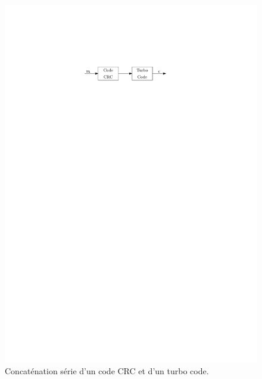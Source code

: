 \begin{figure}[tb]
	\begin{center}
	\includegraphics[]{main/ch1_fig/abaiss/crc.pdf}
	\end{center}
	\caption{Concaténation série d'un code CRC et d'un turbo code. \label{fig:crc}}
\end{figure}


